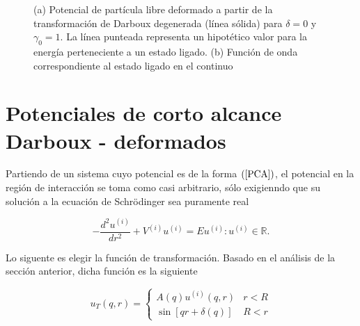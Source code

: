 \begin{figure}
	\centering
	\hfill%
	\caption{\label{PLTD-Figure} (a) Potencial de partícula libre deformado a partir de la transformación de Darboux degenerada (línea sólida) para $\delta = 0$ y $\gamma_0 = 1$. La línea punteada representa un hipotético valor para la energía perteneciente a un estado ligado. (b) Función de onda correspondiente al estado ligado en el continuo}
\end{figure}

\section{Potenciales de corto alcance Darboux - deformados}


Partiendo de un sistema cuyo potencial es de la forma $(\ref{PCA})$, el potencial en la región de interacción se toma como casi arbitrario, sólo exigienndo que su solución a la ecuación de Schrödinger sea puramente real

\begin{equation}
-\frac{d^2 u^{(i)}}{dr^2} + V^{(i)} u^{(i)} = E u^{(i)} : u^{(i)} \in \mathbb{R}.\label{eqRI}
\end{equation}

Lo siguente es elegir la función de transformación. Basado en el análisis de la sección anterior, dicha función es la siguiente

\begin{equation}
\label{FTAT}
u_T(q,r)=\begin{cases}
A(q)u^{(i)} (q,r) & r < R
\\\sin[qr+\delta(q)] & R < r
\end{cases}
\end{equation}

